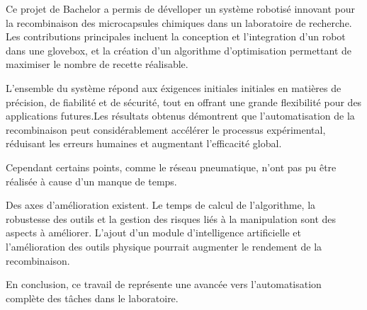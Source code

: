 Ce projet de Bachelor a permis de dévelloper un système robotisé innovant pour la recombinaison des \glspl{microcapsule} chimiques dans un laboratoire de recherche. Les contributions principales incluent la conception et l'integration d'un robot dans une \gls{glovebox}, et la création d'un algorithme d'optimisation permettant de maximiser le nombre de recette réalisable.

L'ensemble du système répond aux éxigences initiales initiales en matières de précision, de fiabilité et de sécurité, tout en offrant une grande flexibilité pour des applications futures.Les résultats obtenus démontrent que l'automatisation de la recombinaison peut considérablement accélérer le processus expérimental, réduisant les erreurs humaines et augmentant l'efficacité global.

Cependant certains points, comme le réseau pneumatique, n'ont pas pu être réalisée à cause d'un manque de temps.

Des axes d'amélioration existent. Le temps de calcul de l'algorithme, la robustesse des outils et la gestion des risques liés à la manipulation sont des aspects à améliorer. L'ajout d'un module d'intelligence artificielle et l'amélioration des outils physique pourrait augmenter le rendement de la recombinaison.

En conclusion, ce travail de représente une avancée vers l'automatisation complète des tâches dans le laboratoire.

\vfil
\hspace{8cm}\makeatletter\@author\makeatother\par
\hspace{8cm}\begin{minipage}{5cm}
\end{minipage}